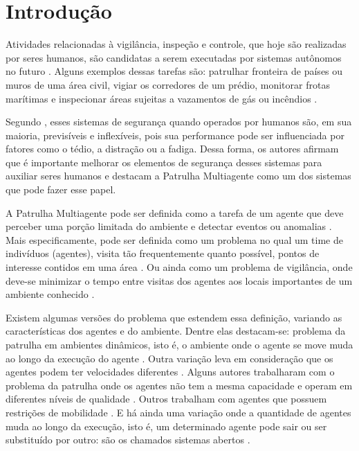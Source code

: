\chapter{Introdução}
\label{chp:introduction}


Atividades relacionadas à vigilância, inspeção e controle, que hoje são 
realizadas por seres humanos, são candidatas a serem executadas por sistemas 
autônomos no futuro \citep{hernandez2013game}. Alguns exemplos dessas tarefas 
são: patrulhar fronteira de países ou muros de uma área civil, vigiar os 
corredores de um prédio, monitorar frotas marítimas e inspecionar áreas sujeitas 
a vazamentos de gás ou incêndios \citep{sampaiophd}.

Segundo \citep{hernandez2013game}, esses sistemas de segurança quando operados 
por humanos são, em sua maioria, previsíveis e inflexíveis, pois sua performance 
pode ser influenciada por fatores como o tédio, a distração ou a fadiga. Dessa 
forma, os autores afirmam que é importante melhorar os elementos de segurança 
desses sistemas para auxiliar seres humanos e destacam a Patrulha Multiagente 
\citep{Chevaleyre:2004:TAM:1018411.1019013} como um dos sistemas que pode fazer 
esse papel.

A Patrulha Multiagente pode ser definida como a tarefa de um agente que deve 
perceber uma porção limitada do ambiente e detectar eventos ou anomalias 
\citep{6315145}. Mais especificamente, pode ser definida como um problema no qual 
um time de indivíduos (agentes), visita tão frequentemente quanto possível, 
pontos de interesse contidos em uma área \citep{6495145}. Ou ainda como um 
problema de vigilância, onde deve-se minimizar o tempo entre visitas dos agentes 
aos locais importantes de um ambiente conhecido 
\citep{Pippin:2013:PBT:2480362.2480378}.

Existem algumas versões do problema que estendem essa definição, variando as 
características dos agentes e do ambiente. Dentre elas destacam-se: problema da 
patrulha em ambientes dinâmicos, isto é, o ambiente onde o agente se move muda 
ao longo da execução do agente \citep{6615158}. Outra variação leva em 
consideração que os agentes podem ter velocidades diferentes \citep{6900280}. 
Alguns autores trabalharam com o problema da patrulha onde os agentes não tem a 
mesma capacidade e operam em diferentes níveis de qualidade 
\citep{Pippin:2013:PBT:2480362.2480378}. Outros trabalham com agentes que 
possuem restrições de mobilidade \citep{6315145}. E há ainda uma variação onde a 
quantidade de agentes muda ao longo da execução, isto é, um determinado agente 
pode sair ou ser substituído por outro: são os chamados sistemas abertos 
\citep{6495145}.

